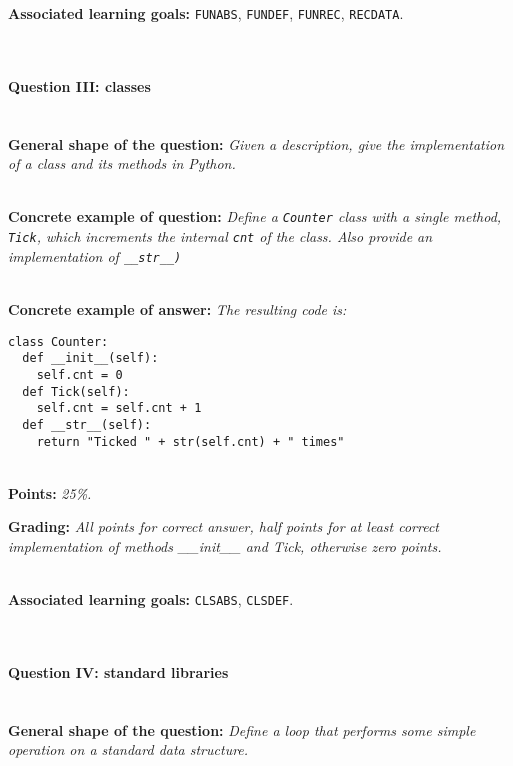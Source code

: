 \textbf{Associated learning goals:} \texttt{FUNABS}, \texttt{FUNDEF}, \texttt{FUNREC}, \texttt{RECDATA}.

\ \\ 

\paragraph{Question III: classes} \ \\

\textbf{General shape of the question:} \textit{Given a description, give the implementation of a class and its methods in Python.}

\ \\ 

\textbf{Concrete example of question:} \textit{Define a \texttt{Counter} class with a single method, \texttt{Tick}, which increments the internal \texttt{cnt} of the class. Also provide an implementation of \texttt{\_\_str\_\_)}}

\ \\ 

\textbf{Concrete example of answer:} \textit{The resulting code is:}

\begin{lstlisting}
class Counter:
  def __init__(self):
    self.cnt = 0
  def Tick(self):
    self.cnt = self.cnt + 1
  def __str__(self):
    return "Ticked " + str(self.cnt) + " times"
\end{lstlisting}

\ \\ 

\textbf{Points:} \textit{25\%.}


\textbf{Grading:} \textit{All points for correct answer, half points for at least correct implementation of methods \_\_init\_\_ and Tick, otherwise zero points.}

\ \\ 

\textbf{Associated learning goals:} \texttt{CLSABS}, \texttt{CLSDEF}.

\ \\

\paragraph{Question IV: standard libraries} \ \\

\textbf{General shape of the question:} \textit{Define a loop that performs some simple operation on a standard data structure.}

